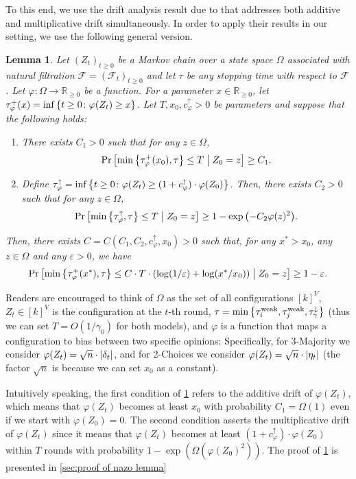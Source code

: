 \documentclass[letterpaper,11pt]{article}
\newtheorem{lemma}[theorem]{Lemma}
\newcommand{\condition}{\;\middle\vert\;}
\newcommand{\Real}{\mathbb{R}}
\newcommand{\calF}{\mathcal{F}}
\newcommand{\alphanorm}{\gamma}
\newcommand{\taunormdown}{\tau^{\downarrow}_\alphanorm}
\newcommand{\tauiweak}{\tau^{\mathrm{weak}}_i}
\newcommand{\taujweak}{\tau^{\mathrm{weak}}_j}
\newcommand{\tauphiplus}{\tau_\varphi^+}
\newcommand{\tauphiup}{\tau^\uparrow_\varphi}
\newcommand{\cphiup}{c_\varphi^{\uparrow}}
\begin{document}
To this end, we use the drift analysis result due to \cite{Doerr11} that addresses both additive and multiplicative drift simultaneously.
In order to apply their results in our setting, we use the following general version.
\begin{lemma} \label{lem:nazo lemma}
Let $ (Z_t)_{t\ge 0} $ be a Markov chain over a state space $ \Omega $ associated with natural filtration $\calF=(\calF_t)_{t\ge 0}$ and let $\tau$ be any stopping time with respect to $\calF$.
Let $ \varphi \colon \Omega \to \Real_{\ge 0} $ be a function.
For a parameter $ x\in\Real_{\ge 0} $, let $ \tauphiplus(x) = \inf\qty{t\ge 0 \colon \varphi(Z_t) \ge x} $.
Let $ T,x_0,\cphiup>0 $ be parameters and suppose that the following holds:
\begin{enumerate}
            \renewcommand{\labelenumi}{(\roman{enumi})}
\item There exists $ C_1>0 $ such that for any $ z \in \Omega $, \[ \Pr\qty[\min\qty{\tauphiplus(x_0), \tau}\le T\condition Z_0=z] \ge C_1. \] 
\item Define $ \tauphiup = \inf\qty{ t\ge 0 \colon \varphi(Z_t) \ge (1+\cphiup) \cdot \varphi(Z_0) } $.
Then, there exists $ C_2>0$ such that for any $ z \in \Omega $, \[ \Pr\qty[ \min\qty{\tauphiup, \tau} \le T \condition Z_0 = z ] \ge 1-\exp\qty( - C_2 \varphi(z)^2 ).\] 
\end{enumerate}
Then, there exists $ C = C(C_1,C_2,\cphiup,x_0) >0 $ such that,
for any $ x^* > x_0$, any $ z \in \Omega $ and any $ \varepsilon>0 $, we have
\begin{align*} 
  \Pr\qty[ \min\qty{\tauphiplus(x^*), \tau} \le C\cdot T\cdot \qty(\log(1/\varepsilon) +  \log(x^*/x_0)) \condition Z_0 = z] \ge 1-\varepsilon.
\end{align*}
\end{lemma}
Readers are encouraged to think of $\Omega$ as the set of all configurations $[k]^V$,
$Z_t \in [k]^V$ is the configuration at the $t$-th round, $\tau=\min\qty{\tauiweak,\taujweak,\taunormdown}$ (thus we can set $T=O(1/\alphanorm_0)$ for both models),
and $\varphi$ is a function that maps a configuration to bias between two specific opinions:
Specifically, for 3-Majority we consider $\varphi(Z_t)=\sqrt{n}\cdot \abs{\delta_t}$, and for 2-Choices we consider $\varphi(Z_t)=\sqrt{n}\cdot \abs{\eta_t}$ (the factor $ \sqrt{n} $ is because we can set $ x_0 $ as a constant).

Intuitively speaking, the first condition of \cref{lem:nazo lemma} refers to the additive drift of $\varphi(Z_t)$, which means that $\varphi(Z_t)$ becomes at least $x_0$ with probability $C_1=\Omega(1)$ even if we start with $\varphi(Z_0)=0$.
The second condition asserts the multiplicative drift of $\varphi(Z_t)$ since it means that $\varphi(Z_t)$ becomes at least $(1+\cphiup)\cdot \varphi(Z_0)$ within $T$ rounds with probability $1-\exp(\Omega(\varphi(Z_0)^2))$.
The proof of \cref{lem:nazo lemma} is presented in \cref{sec:proof of nazo lemma}
\end{document}
